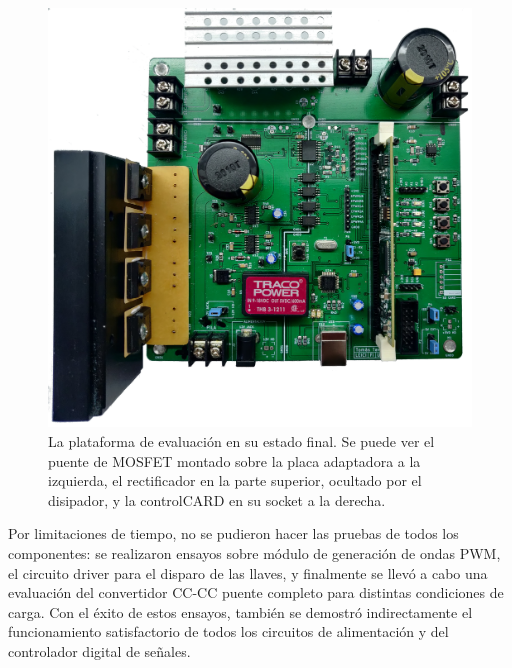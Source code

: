 \begin{figure}[h]
    \centering
    \includegraphics[scale=0.1]{Imagenes/Placa Final.jpg}
    \caption{La plataforma de evaluación en su estado final. Se puede ver el puente de MOSFET montado sobre la placa adaptadora a la izquierda, el rectificador en la parte superior, ocultado por el disipador, y la controlCARD en su socket a la derecha.}
    \label{plataforma_completa}
\end{figure}

Por limitaciones de tiempo, no se pudieron hacer las pruebas de todos los componentes: se realizaron ensayos sobre módulo de generación de ondas PWM, el circuito driver para el disparo de las llaves, y finalmente se llevó a cabo una evaluación del convertidor CC-CC puente completo para distintas condiciones de carga. Con el éxito de estos ensayos, también se demostró indirectamente el funcionamiento satisfactorio de todos los circuitos de alimentación y del controlador digital de señales.\\



\newpage



\newpage



\newpage



\afterpage{\blankpage}\newpage